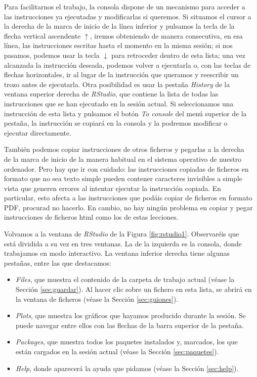 \documentclass[
]{book}
\providecommand{\tightlist}{%
  \setlength{\itemsep}{0pt}\setlength{\parskip}{0pt}}
\theoremstyle{definition}
\theoremstyle{definition}
\theoremstyle{definition}
\theoremstyle{remark}
\begin{document}
Para facilitarnos el trabajo, la consola dispone de un mecanismo para acceder a las instrucciones ya ejecutadas y modificarlas si queremos. Si situamos el cursor a la derecha de la marca de inicio de la línea inferior y pulsamos la tecla de la flecha vertical ascendente \(\uparrow\), iremos obteniendo de manera consecutiva, en esa línea, las instrucciones escritas hasta el momento en la misma sesión; si nos pasamos, podemos usar la tecla \(\downarrow\) para retroceder dentro de esta lista; una vez alcanzada la instrucción deseada, podemos volver a ejecutarla o, con las teclas de flechas horizontales, ir al lugar de la instrucción que queramos y reescribir un trozo antes de ejecutarla. Otra posibilidad es usar la pestaña \emph{History} de la ventana superior derecha de \emph{RStudio}, que contiene la lista de todas las instrucciones que se han ejecutado en la sesión actual. Si seleccionamos una instrucción de esta lista y pulsamos el botón \emph{To console} del menú superior de la pestaña, la instrucción se copiará en la consola y la podremos modificar o ejecutar directamente.

También podemos copiar instrucciones de otros ficheros y pegarlas a la derecha de la marca de inicio de la manera habitual en el sistema operativo de nuestro ordenador. Pero hay que ir con cuidado: las instrucciones copiadas de ficheros en formato que no sea texto simple pueden contener caracteres invisibles a simple vista que generen errores al intentar ejecutar la instrucción copiada. En particular, esto afecta a las instrucciones que podáis copiar de ficheros en formato PDF, procurad no hacerlo. En cambio, no hay ningún problema en copiar y pegar instrucciones de ficheros html como los de estas lecciones.

Volvamos a la ventana de \emph{RStudio} de la Figura \ref{fig:rstudio1}. Observaréis que está dividida a su vez en tres ventanas. La de la izquierda es la consola, donde trabajamos en modo interactivo. La ventana inferior derecha tiene algunas pestañas, entre las que destacamos:

\begin{itemize}
\tightlist
\item
  \emph{Files}, que muestra el contenido de la carpeta de trabajo actual (véase la Sección \ref{sec:guardar}). Al hacer clic sobre un fichero en esta lista, se abrirá en la ventana de ficheros (véase la Sección \ref{sec:guiones}).
\item
  \emph{Plots}, que muestra los gráficos que hayamos producido durante la sesión. Se puede navegar entre ellos con las flechas de la barra superior de la pestaña.
\item
  \emph{Packages}, que muestra todos los paquetes instalados y, marcados, los que están cargados en la sesión actual (véase la Sección \ref{sec:paquetes}).
\item
  \emph{Help}, donde aparecerá la ayuda que pidamos (véase la Sección \ref{sec:help}).
\end{itemize}
\end{document}

